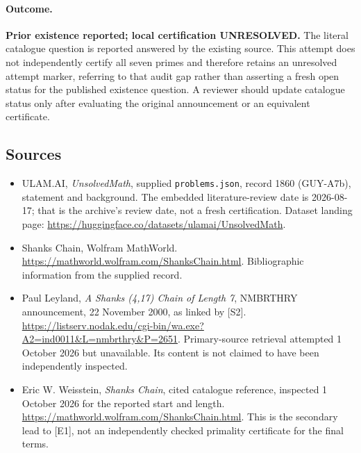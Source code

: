 \documentclass[11pt,a4paper]{article}
\begin{document}
\paragraph{Outcome.}
\textbf{Prior existence reported; local certification UNRESOLVED.}
The literal catalogue question is reported answered by the existing
source. This attempt does not independently certify all seven primes
and therefore retains an unresolved attempt marker, referring to that
audit gap rather than asserting a fresh open status for the published
existence question. A reviewer should update catalogue status only
after evaluating the original announcement or an equivalent certificate.

\subsection{Sources}

{\small

\begin{itemize}

\item[\hypertarget{source:1860:1}{S1}] ULAM.AI, \emph{UnsolvedMath}, supplied \texttt{problems.json}, record 1860 (GUY-A7b), statement and background. The embedded literature-review date is 2026-08-17; that is the archive’s review date, not a fresh certification. Dataset landing page: \url{https://huggingface.co/datasets/ulamai/UnsolvedMath}.

\item[\hypertarget{source:1860:2}{S2}] Shanks Chain, Wolfram MathWorld. \url{https://mathworld.wolfram.com/ShanksChain.html}. Bibliographic information from the supplied record.


\item[E1] Paul Leyland, \emph{A Shanks (4,17) Chain of Length 7},
NMBRTHRY announcement, 22 November 2000, as linked by [S2].
\url{https://listserv.nodak.edu/cgi-bin/wa.exe?A2=ind0011&L=nmbrthry&P=2651}.
Primary-source retrieval attempted 1 October 2026 but unavailable.
Its content is not claimed to have been independently inspected.
\item[E2] Eric W. Weisstein, \emph{Shanks Chain}, cited catalogue
reference, inspected 1 October 2026 for the reported start and length.
\url{https://mathworld.wolfram.com/ShanksChain.html}.
This is the secondary lead to [E1], not an independently checked
primality certificate for the final terms.

\end{itemize}

}

\label{end:1860}
\end{document}
